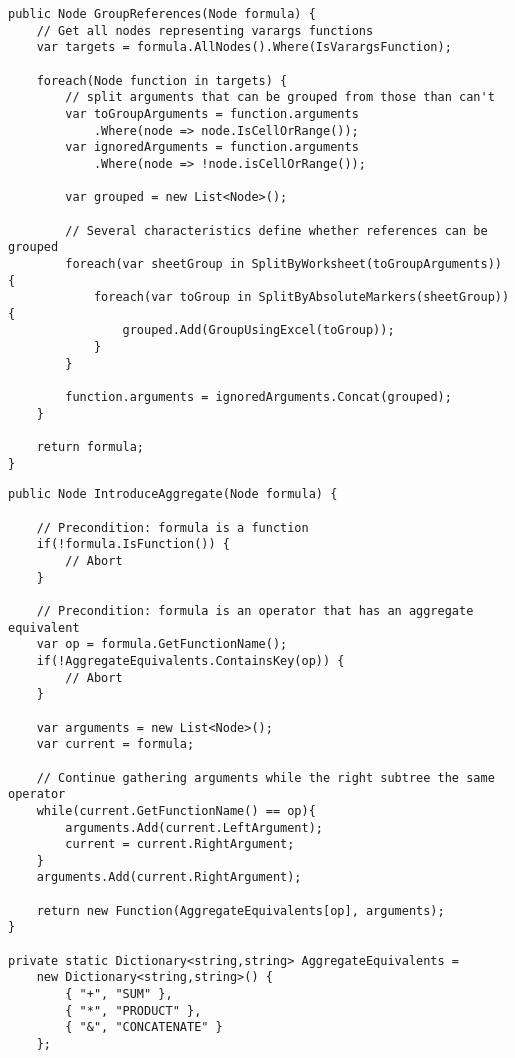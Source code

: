 \lstset{style=sharpc}
\begin{lstlisting}[float,caption={Group References Refactoring (simplified)}, label={lst:groupreferences}]
public Node GroupReferences(Node formula) {
	// Get all nodes representing varargs functions
	var targets = formula.AllNodes().Where(IsVarargsFunction);
	
	foreach(Node function in targets) {
		// split arguments that can be grouped from those than can't
		var toGroupArguments = function.arguments
			.Where(node => node.IsCellOrRange());
		var ignoredArguments = function.arguments
			.Where(node => !node.isCellOrRange());
		
		var grouped = new List<Node>();
		
		// Several characteristics define whether references can be grouped
		foreach(var sheetGroup in SplitByWorksheet(toGroupArguments)) {
			foreach(var toGroup in SplitByAbsoluteMarkers(sheetGroup)) {
				grouped.Add(GroupUsingExcel(toGroup));
			}
		}
		
		function.arguments = ignoredArguments.Concat(grouped);
	}
	
	return formula;
}

\end{lstlisting}

\lstset{style=sharpc}
\begin{lstlisting}[float,caption={Introduce Aggregate (simplified)}, label={lst:introduceaggregate}]
public Node IntroduceAggregate(Node formula) {

	// Precondition: formula is a function
	if(!formula.IsFunction()) {
		// Abort
	}
	
	// Precondition: formula is an operator that has an aggregate equivalent
	var op = formula.GetFunctionName();
	if(!AggregateEquivalents.ContainsKey(op)) {
		// Abort
	}
	
	var arguments = new List<Node>();
	var current = formula;
	
	// Continue gathering arguments while the right subtree the same operator
	while(current.GetFunctionName() == op){
		arguments.Add(current.LeftArgument);
		current = current.RightArgument;
	}
	arguments.Add(current.RightArgument);
	
	return new Function(AggregateEquivalents[op], arguments);
}

private static Dictionary<string,string> AggregateEquivalents =
	new Dictionary<string,string>() {
		{ "+", "SUM" },
		{ "*", "PRODUCT" },
		{ "&", "CONCATENATE" }
	};

\end{lstlisting}

